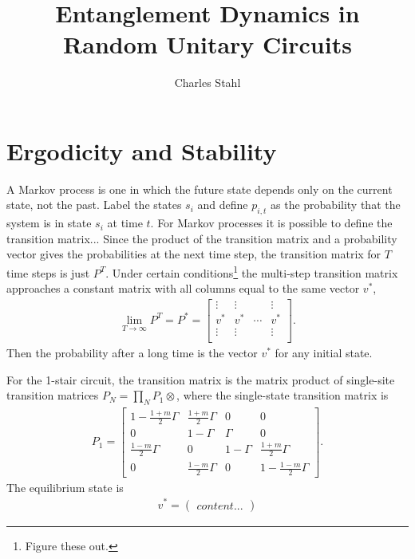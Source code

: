 \documentclass[11pt]{article}
\begin{document}
\title{Entanglement Dynamics in Random Unitary Circuits}
\author{Charles Stahl}

\maketitle

\section{Ergodicity and Stability} \label{sec:erg}

A Markov process is one in which the future state depends only on the current state, not the past. Label the states $s_i$ and define $p_{i,t}$ as the probability that the system is in state $s_i$ at time $t$. For Markov processes it is possible to define the transition matrix... Since the product of the transition matrix and a probability vector gives the probabilities at the next time step, the transition matrix for $T$ time steps is just $P^T$. Under certain conditions\footnote{Figure these out.} the multi-step transition matrix approaches a constant matrix with all columns equal to the same vector $v^*$,
\begin{align}
\lim\limits_{T\to \infty}P^T = P^* = \begin{bmatrix}
\vdots & \vdots &  & \vdots\\
v^* & v^* & \cdots & v^*\\
\vdots & \vdots &  & \vdots\\
\end{bmatrix}.
\end{align}
Then the probability after a long time is the vector $v^*$ for any initial state.

For the 1-stair circuit, the transition matrix is the matrix product of single-site transition matrices $P_{N} = \prod_NP_{1}\otimes$, where the single-state transition matrix is
\begin{align}
P_1 = \begin{bmatrix}
1-\frac{1+m}{2}\Gamma & \frac{1+m}{2}\Gamma & 0 & 0\\
0 & 1-\Gamma & \Gamma & 0\\
\frac{1-m}{2}\Gamma & 0 & 1-\Gamma & \frac{1+m}{2}\Gamma\\
0 & \frac{1-m}{2}\Gamma & 0 & 1 - \frac{1-m}{2}\Gamma
\end{bmatrix}.
\end{align}
The equilibrium state is
\begin{align}
v^* = \begin{pmatrix}
content...
\end{pmatrix}
\end{align}
\end{document}
